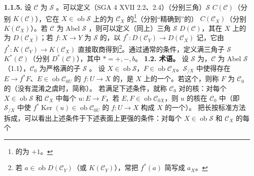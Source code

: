 \textbf{1.1.5.} 设 $\mathscr C$ 为 $\mathscr S$ 。可以定义（SGA 4 XVII 2.2、2.4）（分别三角）$\mathscr S$  $C(\mathscr C)$（分别 $K(\mathscr C)$），它在 $X\in\operatorname{ob}\mathscr S$ 上的为 $\mathscr C_X$ 的\footnote{的为 $+1$。}（分别“精确到”的） $C(\mathscr C_X)$（分别 $K(\mathscr C_X)$）。若 $\mathscr C$ 为 Abel $\mathscr S$ ，则可以定义（同上）三角 $\mathscr S$  $D(\mathscr C)$，其在 $X$ 上的为 $D(\mathscr C_X)$；若 $f:X\to Y$ 为 $\mathscr S$ 的，以 $f^*:D(\mathscr C_Y)\to D(\mathscr C_X)$ 记，它由 $f^*:K(\mathscr C_Y)\to K(\mathscr C_X)$ 直接取商得到\footnote{若 $a\in\operatorname{ob}D(\mathscr C_Y)$（或 $K(\mathscr C_Y)$），常把 $f^*(a)$ 简写成 $a_X$。}。通过通常的条件，定义满三角子 $\mathscr S$  $K^*(\mathscr C)$（分别 $D^*(\mathscr C)$），其中 $*=+,-,b$。
\textbf{1.2. 术语。} 设 $\mathscr S$ 为，$\mathscr C$ 为 Abel $\mathscr S$ （1.1），$\mathscr C_0$ 为严格满的子 $\mathscr S$ 。
设 $X\in\operatorname{ob}\mathscr S$，$F\in\operatorname{ob}\mathscr C_X$。$\mathscr S_{/X}$ 中使得存在 $E\to f^*F$、$E\in\operatorname{ob}\mathscr C_{0U}$ 的 $f:U\to X$ 的，是 $X$ 上的一个。若这个，则称 $F$ 为 $\mathscr C_0$ 的（没有混淆之虞时，简称）。
若满足下述条件，就称 $\mathscr C_0$ 对的核：对每个 $X\in\operatorname{ob}\mathscr S$ 和 $\mathscr C_X$ 中每个 $u:E\to F$，若 $E,F\in\operatorname{ob}\mathscr C_{0X}$，则 $u$ 的核在 $\mathscr C_0$ 中（即 $\mathscr S_{/X}$ 中使 $f^*\operatorname{Ker}(u)\in\operatorname{ob}\mathscr C_{0U}$ 的 $f:U\to X$ 构成 $X$ 的一个）。
把长按标准方法拆成，可以看出上述条件于下述表面上更强的条件：对每个 $X\in\operatorname{ob}\mathscr S$ 和 $\mathscr C_X$ 的每个
